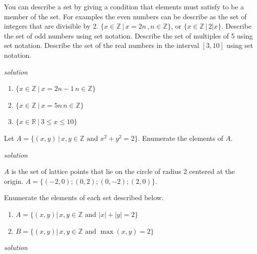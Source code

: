 \documentclass{amsbook}
\begin{document}
\begin{Answer}[ref={s3}]
    
\end{Answer}

\begin{Exercise}[title={Using set notation}, difficulty=1, label=s4]
    You can describe a set by giving a condition that elements must satisfy to be a member of the set. For examples the even numbers can be describe as the set of integers that are divisible by 2. $\{x\in \mathbb{Z} \, \big| \, x=2n \, , n\in\mathbb{Z}\}$, or $\{x \in \mathbb{Z} \, \big| \, 2|x\}$. 
    \Question Describe the set of odd numbers using set notation.
    \Question Describe the set of multiples of 5 using set notation.
    \Question Describe the set of the real numbers in the interval $[3,10]$ using set notation. 
    
    \hfill \emph{solution}    
\end{Exercise}

\begin{Answer}[ref={s4}]
    \begin{enumerate}
        \item $\{x \in \mathbb{Z} \:\big| \: x=2n-1 \, n\in\mathbb{Z}\}$\\
        \item $\{x \in \mathbb{Z} \: \big| \: x=5n \, n\in\mathbb{Z}\}$\\
        \item $\{x \in \mathbb{R} \: \big| \: 3\leq x\leq 10\}$\\
    \end{enumerate}
\end{Answer}

\begin{Exercise}[title={Distance of 2}, difficulty=1, label=s5]
    Let $A=\{(x,y) \, \big| \, x,y \in \mathbb{Z} \mbox{ and } x^2+y^2=2\}$. Enumerate the elements of $A$. 
    
    \hfill \emph{solution} 
\end{Exercise}

\begin{Answer}[ref={s5}]
    $A$ is the set of lattice points that lie on the circle of radius 2 centered at the origin. $A =\{(-2,0);(0,2); (0,-2); (2,0)\}$.
\end{Answer}

\begin{Exercise}[title={Still distance of 2?}, difficulty=2, label=s6]
    Enumerate the elements of each set described below.
        \begin{enumerate}
            \item $A=\{(x,y) \big| \, x,y \in \mathbb{Z} \mbox{ and } |x|+|y|=2\}$\\
            \item $B=\{(x,y) \big| \, x,y \in \mathbb{Z} \mbox{ and } \max(x,y)=2\}$
        \end{enumerate}
        \hfill \emph{solution} 
\end{Exercise}
\end{document}
